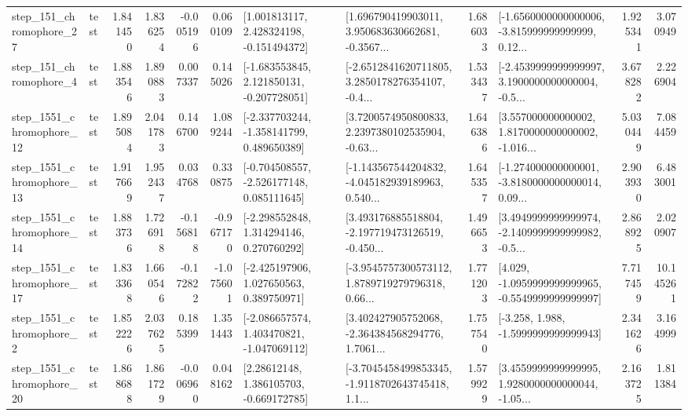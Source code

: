 \begin{tabular}{llrrrrllrlrr}
  step\_151\_chromophore\_27 &      test &      1.841450 &    1.836254 &     -0.005196 &  0.060109 &    [1.001813117, 2.428324198, -0.151494372] &  [1.696790419903011, 3.950683630662681, -0.3567... &       1.686033 &  [-1.6560000000000006, -3.815999999999999, 0.12... &            1.925341 &          3.070949 \\
   step\_151\_chromophore\_4 &      test &      1.883546 &    1.890883 &      0.007337 &  0.145026 &   [-1.683553845, 2.121850131, -0.207728051] &  [-2.6512841620711805, 3.2850178276354107, -0.4... &       1.533437 &  [-2.4539999999999997, 3.1900000000000004, -0.5... &            3.678282 &          2.226904 \\
 step\_1551\_chromophore\_12 &      test &      1.895084 &    2.041783 &      0.146700 &  1.089244 &   [-2.337703244, -1.358141799, 0.489650389] &  [3.7200574950800833, 2.2397380102535904, -0.63... &       1.646386 &  [3.557000000000002, 1.8170000000000002, -1.016... &            5.030449 &          7.084459 \\
 step\_1551\_chromophore\_13 &      test &      1.917669 &    1.952437 &      0.034768 &  0.330875 &   [-0.704508557, -2.526177148, 0.085111645] &  [-1.143567544204832, -4.045182939189963, 0.540... &       1.645357 &  [-1.274000000000001, -3.8180000000000014, 0.09... &            2.903930 &          6.483001 \\
 step\_1551\_chromophore\_14 &      test &      1.883736 &    1.726918 &     -0.156818 & -0.967170 &    [-2.298552848, 1.314294146, 0.270760292] &  [3.493176885518804, -2.197719473126519, -0.450... &       1.496653 &  [3.4949999999999974, -2.1409999999999982, -0.5... &            2.868925 &          2.020907 \\
 step\_1551\_chromophore\_17 &      test &      1.833368 &    1.660546 &     -0.172822 & -1.075601 &    [-2.425197906, 1.027650563, 0.389750971] &  [-3.9545757300573112, 1.8789719279796318, 0.66... &       1.771203 &  [4.029, -1.0959999999999965, -0.5549999999999997] &            7.717459 &         10.145261 \\
  step\_1551\_chromophore\_2 &      test &      1.852226 &    2.037625 &      0.185399 &  1.351443 &   [-2.086657574, 1.403470821, -1.047069112] &  [3.402427905752068, -2.364384568294776, 1.7061... &       1.757540 &               [-3.258, 1.988, -1.5999999999999943] &            2.341626 &          3.164999 \\
 step\_1551\_chromophore\_20 &      test &      1.868688 &    1.861729 &     -0.006960 &  0.048162 &     [2.28612148, 1.386105703, -0.669172785] &  [-3.7045458499853345, -1.9118702643745418, 1.1... &       1.579929 &  [3.4559999999999995, 1.9280000000000044, -1.05... &            2.163725 &          1.811384 \\

\end{tabular}
